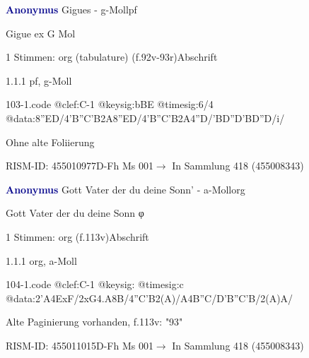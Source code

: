 \documentclass[twocolumn]{book}
\begin{document}
\par \vspace{7pt} \textcolor{darkblue}{\textbf{Anonymus  }}\hfillplus{\textbf{[103]}}\newline Gigues - g-Moll\newline pf
\par \begin{itshape} Gigue ex G Mol\end{itshape} 
\par \textcolor{darkblue}{}  1 Stimmen: org (tabulature)  (f.92v-93r)\newline Abschrift
\par 1.1.1  pf, g-Moll  
\begin{filecontents*}{103-1.code}
@clef:C-1
@keysig:bBE
@timesig:6/4
@data:{8''ED}/4'B''C'B2A{8''ED}/4'B''C'B2A4''D/'BD''D'BD''D/i/
\end{filecontents*}
\newline
%
\par Ohne alte Foliierung
\par RISM-ID: 455010977\newline D-Fh  Ms 001\newline $\rightarrow$ In Sammlung 418 (455008343)
      
\par \vspace{7pt} \textcolor{darkblue}{\textbf{Anonymus  }}\hfillplus{\textbf{[104]}}\newline Gott Vater der du deine Sonn' - a-Moll\newline org
\par \begin{itshape}[f.113v, heading:] Gott Vater der du deine Sonn φ\end{itshape} 
\par \textcolor{darkblue}{}  1 Stimmen: org  (f.113v)\newline Abschrift
\par 1.1.1  org, a-Moll  
\begin{filecontents*}{104-1.code}
@clef:C-1
@keysig:
@timesig:c
@data:2'A4ExF/2xG4.A8B/4''C'B2(A)/A4B''C/D'B''C'B/2(A)A/
\end{filecontents*}
\newline
%
\par Alte Paginierung vorhanden, f.113v: "93"
\par RISM-ID: 455011015\newline D-Fh  Ms 001\newline $\rightarrow$ In Sammlung 418 (455008343)
      
\end{document}
